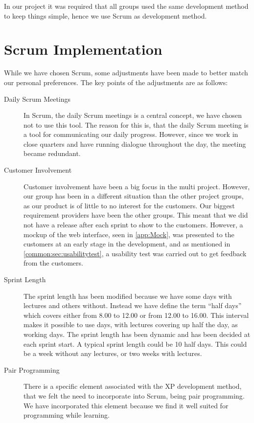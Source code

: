 In our project it was required that all groups used the same development method to keep things simple, hence we use Scrum as development method.

\section{Scrum Implementation}
While we have chosen Scrum, some adjustments have been made to better match our personal preferences. 
The key points of the adjustments are as follows:

\begin{description}
\item [Daily Scrum Meetings]
      In Scrum, the daily Scrum meetings is a central concept, we have chosen not to use this tool. The reason for this is, that the daily Scrum meeting is a tool for communicating our daily progress. However, since we work in close quarters and have running dialogue throughout the day, the meeting became redundant.

\item [Customer Involvement]
      Customer involvement have been a big focus in the multi project. However, our group has been in a different situation than the other project groups, as our product is of little to no interest for the customers. Our biggest requirement providers have been the other groups. This meant that we did not have a release after each sprint to show to the customers. However, a mockup of the web interface, seen in \autoref{app:Mock}, was presented to the customers at an early stage in the development, and as mentioned in \autoref{common:sec:usabilitytest}, a usability test was carried out to get feedback from the customers. 

\item [Sprint Length]
      The sprint length has been modified because we have some days with lectures and others without. Instead we have define the term ``half days'' which covers either from 8.00 to 12.00 or from 12.00 to 16.00. This interval makes it possible to use days, with lectures covering up half the day, as working days. The sprint length has been dynamic and has been decided at each sprint start. A typical sprint length could be 10 half days. This could be a week without any lectures, or two weeks with lectures. 

\item [Pair Programming]
      There is a specific element associated with the XP development method, that we felt the need to incorporate into Scrum, being pair programming\cite{larman}. We have incorporated this element because we find it well suited for programming while learning.

\end{description}







